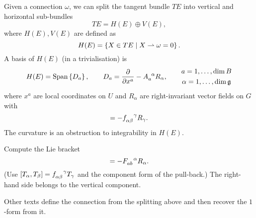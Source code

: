 Given a connection $\omega$, we can split the tangent bundle $T E$ into vertical and horizontal sub-bundles
\begin{equation}
  T E = H(E) \oplus V(E),
\end{equation}
where $H(E), V(E)$ are defined as
\begin{equation}
  H(E) = \left\{X \in TE \suchthat X \rightharpoonup \omega = 0\right\}.
\end{equation}
A basis of $H(E)$ (in a trivialisation) is
\begin{equation}
  H(E) = \text{Span}\left\{D_a\right\}, \qquad D_a = \frac{\partial }{\partial x^{a}} - A \indices{_a^{\alpha}} R_{\alpha}, \qquad 
  \begin{gathered}
    a = 1, \dots, \dim B \\
    \alpha = 1, \dots, \dim \mathfrak{g}
  \end{gathered}
\end{equation}
where $x^{a}$ are local coordinates on $U$ and $R_{\alpha}$ are right-invariant vector fields on $G$ with
\begin{equation}
  [R_{\alpha}, R_{\beta}] = -f\indices{_{\alpha\beta}^{\gamma}} R_{\gamma}.
\end{equation}
The curvature is an obstruction to integrability in $H(E)$.
\begin{exercise}
  Compute the Lie bracket
  \begin{equation}
    [D_{a}, D_{b}] = -F\indices{_{ab}^{\alpha}} R_{\alpha}.
  \end{equation}
  (Use $[T_{\alpha}, T_{\beta}] = f\indices{_{\alpha\beta}^{\gamma}} T_{\gamma}$ and the component form of the pull-back.)
  The right-hand side belongs to the vertical component.
\end{exercise}
Other texts define the connection from the splitting above and then recover the $1$-form from it.

